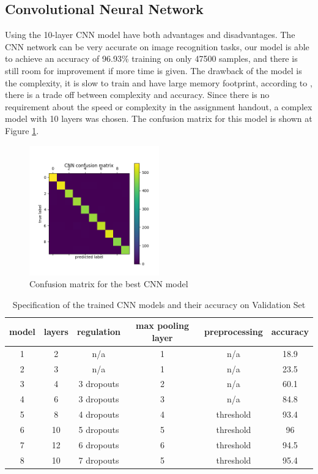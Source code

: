 \documentclass[letterpaper, 10 pt, conference]{ieeeconf}  %
\begin{document}
\subsection{Convolutional Neural Network}
Using the 10-layer CNN model have both advantages and disadvantages. The CNN network can be very accurate on image recognition tasks, our model is able to achieve an accuracy of 96.93\% training on only 47500 samples, and there is still room for improvement if more time is given. The drawback of the model is the complexity, it is slow to train and have large memory footprint, according to \cite{dhingra2017model}, there is a trade off between complexity and accuracy. Since there is no requirement about the speed or complexity in the assignment handout, a complex model with 10 layers was chosen. The confusion matrix for this model is shown at Figure \ref{fig:cnnconf}.
\begin{figure}[h]
	\begin{center}
			\includegraphics[width=0.5\textwidth]{figures/cnn_conf.png}  %
		\caption{Confusion matrix for the best CNN model}
		\label{fig:cnnconf}
	\end{center}
\end{figure}


\begin{table}[t]
	\centering
	\caption{Specification of the trained CNN models and their accuracy on Validation Set}
	\label{tab:CNNmodels}
	\begin{tabular}{|c|c|c|c|c|c|}
		\hline
		model	&layers&	regulation&	max pooling layer&preprocessing&accuracy\\\hline
		1&	2& n/a & 1   &	n/a		&18.9\\\hline	
		2&	3&	n/a		&1  &	n/a		&23.5\\\hline
		3&	4&	3 dropouts&2&	n/a		&60.1\\\hline
		4&	6&	3 dropouts&3&	n/a		& 84.8	\\\hline
		5&	8&	4 dropouts&4&threshold&93.4	\\\hline
		6&	10&	5 dropouts&5&threshold &96\\\hline
		7&	12&	6 dropouts&6&threshold&94.5\\\hline	
		8&	10&	7 dropouts&5&threshold&95.4\\\hline			
	\end{tabular}
\end{table}
\end{document}
